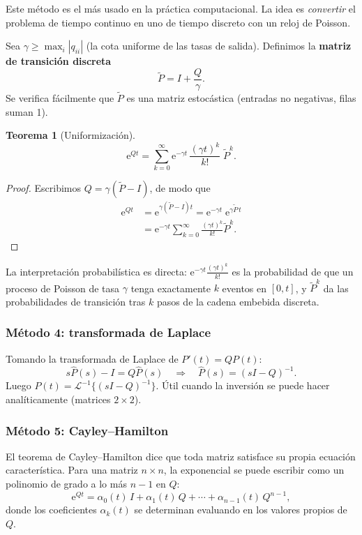 \documentclass[11pt,a4paper]{article}
\theoremstyle{definition}
\newtheorem{teorema}{Teorema}[section]
\theoremstyle{remark}
\newcommand{\e}{\mathrm{e}}
\begin{document}
Este método es el más usado en la práctica computacional.  La idea es
\emph{convertir} el problema de tiempo continuo en uno de tiempo discreto
con un reloj de Poisson.

Sea $\gamma \ge \max_i |q_{ii}|$ (la cota uniforme de las tasas de
salida).  Definimos la \textbf{matriz de transición discreta}
\[
  \tilde{P} = I + \frac{Q}{\gamma}.
\]
Se verifica fácilmente que $\tilde{P}$ es una matriz estocástica (entradas
no negativas, filas suman 1).

\begin{teorema}[Uniformización]
\[
  \e^{Qt} = \sum_{k=0}^{\infty} \e^{-\gamma t}\,
    \frac{(\gamma t)^k}{k!}\;\tilde{P}^k.
\]
\end{teorema}

\begin{proof}
Escribimos $Q = \gamma(\tilde{P}-I)$, de modo que
\begin{align*}
  \e^{Qt}
  &= \e^{\gamma(\tilde{P}-I)t}
   = \e^{-\gamma t}\;\e^{\gamma \tilde{P}\,t} \\
  &= \e^{-\gamma t}\sum_{k=0}^{\infty}\frac{(\gamma t)^k}{k!}\tilde{P}^k.
\end{align*}
\end{proof}

La interpretación probabilística es directa: $\e^{-\gamma t}\frac{(\gamma t)^k}{k!}$ es la probabilidad de que un proceso de Poisson de tasa $\gamma$ tenga exactamente $k$ eventos en $[0,t]$, y $\tilde{P}^k$ da las probabilidades de transición tras $k$ pasos de la cadena embebida discreta.

\subsubsection{Método 4: transformada de Laplace}

Tomando la transformada de Laplace de $P'(t) = QP(t)$:
\[
  s\hat{P}(s) - I = Q\hat{P}(s)
  \quad\Longrightarrow\quad
  \hat{P}(s) = (sI - Q)^{-1}.
\]
Luego $P(t) = \mathcal{L}^{-1}\{(sI-Q)^{-1}\}$.  Útil cuando la
inversión se puede hacer analíticamente (matrices $2\times 2$).

\subsubsection{Método 5: Cayley--Hamilton}

El teorema de Cayley--Hamilton dice que toda matriz satisface su propia
ecuación característica.  Para una matriz $n\times n$, la exponencial se
puede escribir como un polinomio de grado a lo más $n-1$ en $Q$:
\[
  \e^{Qt} = \alpha_0(t)\,I + \alpha_1(t)\,Q + \cdots
             + \alpha_{n-1}(t)\,Q^{n-1},
\]
donde los coeficientes $\alpha_k(t)$ se determinan evaluando en los
valores propios de $Q$.
\end{document}
